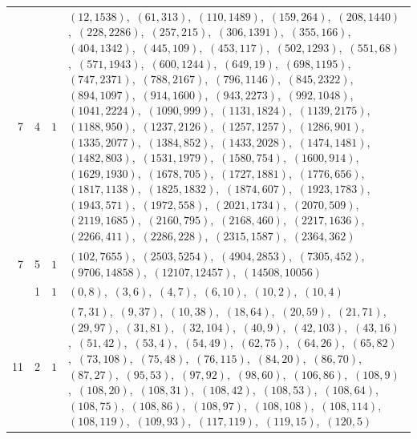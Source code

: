 \documentclass[11pt]{article}
\begin{document}
\begin{longtable}{@{}rrl>{\raggedright\arraybackslash}p{}@{}}
7 & 4 & $1$ & $(12,1538)$,\allowbreak\ $(61,313)$,\allowbreak\ $(110,1489)$,\allowbreak\ $(159,264)$,\allowbreak\ $(208,1440)$,\allowbreak\ $(228,2286)$,\allowbreak\ $(257,215)$,\allowbreak\ $(306,1391)$,\allowbreak\ $(355,166)$,\allowbreak\ $(404,1342)$,\allowbreak\ $(445,109)$,\allowbreak\ $(453,117)$,\allowbreak\ $(502,1293)$,\allowbreak\ $(551,68)$,\allowbreak\ $(571,1943)$,\allowbreak\ $(600,1244)$,\allowbreak\ $(649,19)$,\allowbreak\ $(698,1195)$,\allowbreak\ $(747,2371)$,\allowbreak\ $(788,2167)$,\allowbreak\ $(796,1146)$,\allowbreak\ $(845,2322)$,\allowbreak\ $(894,1097)$,\allowbreak\ $(914,1600)$,\allowbreak\ $(943,2273)$,\allowbreak\ $(992,1048)$,\allowbreak\ $(1041,2224)$,\allowbreak\ $(1090,999)$,\allowbreak\ $(1131,1824)$,\allowbreak\ $(1139,2175)$,\allowbreak\ $(1188,950)$,\allowbreak\ $(1237,2126)$,\allowbreak\ $(1257,1257)$,\allowbreak\ $(1286,901)$,\allowbreak\ $(1335,2077)$,\allowbreak\ $(1384,852)$,\allowbreak\ $(1433,2028)$,\allowbreak\ $(1474,1481)$,\allowbreak\ $(1482,803)$,\allowbreak\ $(1531,1979)$,\allowbreak\ $(1580,754)$,\allowbreak\ $(1600,914)$,\allowbreak\ $(1629,1930)$,\allowbreak\ $(1678,705)$,\allowbreak\ $(1727,1881)$,\allowbreak\ $(1776,656)$,\allowbreak\ $(1817,1138)$,\allowbreak\ $(1825,1832)$,\allowbreak\ $(1874,607)$,\allowbreak\ $(1923,1783)$,\allowbreak\ $(1943,571)$,\allowbreak\ $(1972,558)$,\allowbreak\ $(2021,1734)$,\allowbreak\ $(2070,509)$,\allowbreak\ $(2119,1685)$,\allowbreak\ $(2160,795)$,\allowbreak\ $(2168,460)$,\allowbreak\ $(2217,1636)$,\allowbreak\ $(2266,411)$,\allowbreak\ $(2286,228)$,\allowbreak\ $(2315,1587)$,\allowbreak\ $(2364,362)$\\
7 & 5 & $1$ & $(102,7655)$,\allowbreak\ $(2503,5254)$,\allowbreak\ $(4904,2853)$,\allowbreak\ $(7305,452)$,\allowbreak\ $(9706,14858)$,\allowbreak\ $(12107,12457)$,\allowbreak\ $(14508,10056)$\\
\addlinespace[3pt]
11 & 1 & $1$ & $(0,8)$,\allowbreak\ $(3,6)$,\allowbreak\ $(4,7)$,\allowbreak\ $(6,10)$,\allowbreak\ $(10,2)$,\allowbreak\ $(10,4)$\\
11 & 2 & $1$ & $(7,31)$,\allowbreak\ $(9,37)$,\allowbreak\ $(10,38)$,\allowbreak\ $(18,64)$,\allowbreak\ $(20,59)$,\allowbreak\ $(21,71)$,\allowbreak\ $(29,97)$,\allowbreak\ $(31,81)$,\allowbreak\ $(32,104)$,\allowbreak\ $(40,9)$,\allowbreak\ $(42,103)$,\allowbreak\ $(43,16)$,\allowbreak\ $(51,42)$,\allowbreak\ $(53,4)$,\allowbreak\ $(54,49)$,\allowbreak\ $(62,75)$,\allowbreak\ $(64,26)$,\allowbreak\ $(65,82)$,\allowbreak\ $(73,108)$,\allowbreak\ $(75,48)$,\allowbreak\ $(76,115)$,\allowbreak\ $(84,20)$,\allowbreak\ $(86,70)$,\allowbreak\ $(87,27)$,\allowbreak\ $(95,53)$,\allowbreak\ $(97,92)$,\allowbreak\ $(98,60)$,\allowbreak\ $(106,86)$,\allowbreak\ $(108,9)$,\allowbreak\ $(108,20)$,\allowbreak\ $(108,31)$,\allowbreak\ $(108,42)$,\allowbreak\ $(108,53)$,\allowbreak\ $(108,64)$,\allowbreak\ $(108,75)$,\allowbreak\ $(108,86)$,\allowbreak\ $(108,97)$,\allowbreak\ $(108,108)$,\allowbreak\ $(108,114)$,\allowbreak\ $(108,119)$,\allowbreak\ $(109,93)$,\allowbreak\ $(117,119)$,\allowbreak\ $(119,15)$,\allowbreak\ $(120,5)$\\

\end{longtable}
\end{document}
